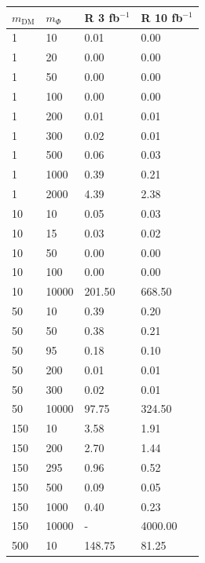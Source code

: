 \begin{table}[h!]
\centering
\begin{tabular}{llll}
\hline                      
 $m_\textrm{DM}$ & $m_\Phi$  & R 3 fb$^{-1}$ & R 10 fb$^{-1}$ \\ \hline

1  &       10  &      0.01  &    0.00 \\\hline
1  &       20  &      0.00  &    0.00 \\\hline
1  &       50  &      0.00  &    0.00 \\\hline
1  &       100  &     0.00  &    0.00 \\\hline
1  &       200  &     0.01  &    0.01 \\\hline
1  &       300  &     0.02  &    0.01 \\\hline
1  &       500  &     0.06  &    0.03 \\\hline
1  &       1000  &    0.39  &    0.21 \\\hline
1  &       2000  &    4.39  &    2.38 \\\hline
10  &      10  &      0.05  &    0.03 \\\hline
10  &      15  &      0.03  &    0.02 \\\hline
10  &      50  &      0.00  &    0.00 \\\hline
10  &      100  &     0.00  &    0.00 \\\hline
10  &      10000  &   201.50  &  668.50 \\\hline
50  &      10  &      0.39  &    0.20 \\\hline
50  &      50  &      0.38  &    0.21 \\\hline
50  &      95  &      0.18  &    0.10 \\\hline
50  &      200  &     0.01  &    0.01 \\\hline
50  &      300  &     0.02  &    0.01 \\\hline
50  &      10000  &   97.75  &   324.50 \\\hline
150  &     10  &      3.58  &    1.91 \\\hline
150  &     200  &     2.70  &    1.44 \\\hline
150  &     295  &     0.96  &    0.52 \\\hline
150  &     500  &     0.09  &    0.05 \\\hline
150  &     1000  &    0.40  &    0.23 \\\hline
150  &     10000  &   -     &  4000.00   \\ \hline
500  &     10  &      148.75  &  81.25 \\\hline

\end{tabular}
\end{table}
